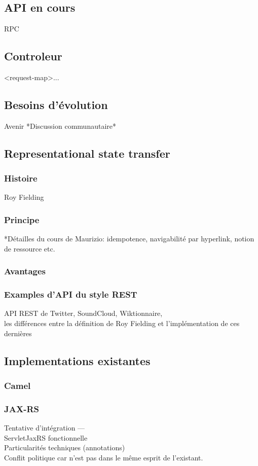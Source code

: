 \subsection{API en cours}
RPC
\subsection{Controleur}
<request-map>...
\subsection{Besoins d'évolution}
Avenir
*Discussion communautaire*
\subsection{Representational state transfer}
\subsubsection{Histoire}
Roy Fielding
\subsubsection{Principe}
*Détailles du cours de Maurizio: idempotence, navigabilité par hyperlink, 
notion de ressource etc.
\subsubsection{Avantages}
\subsubsection{Examples d'API du style REST}
API REST de Twitter, SoundCloud, Wiktionnaire,\\
les différences entre la définition de Roy Fielding et l'implémentation de ces dernières

\subsection{Implementations existantes}
\subsubsection{Camel}
\subsubsection{JAX-RS}
Tentative d'intégration ---\\
ServletJaxRS fonctionnelle\\
Particularités techniques (annotations) \\
Conflit politique car n'est pas dans le même esprit de l'existant.\\



